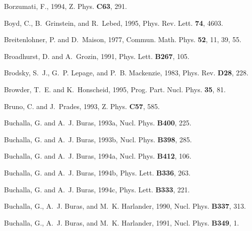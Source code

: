 \begin{thebibliography}{\protect{}1991}
Borzumati, F., 1994,
\newblock Z. Phys. {\bf C63}, 291.

Boyd, C., B.~Grinstein, and R.~Lebed, 1995,
\newblock Phys. Rev. Lett. {\bf 74}, 4603.

Breitenlohner, P. and D.~Maison, 1977,
\newblock Commun. Math. Phys. {\bf 52}, 11, 39, 55.

Broadhurst, D. and A.~Grozin, 1991,
\newblock Phys. Lett. {\bf B267}, 105.

Brodsky, S.~J., G.~P. Lepage, and P.~B. Mackenzie, 1983,
\newblock Phys. Rev. {\bf D28}, 228.

Browder, T.~E. and K.~Honscheid, 1995,
\newblock Prog. Part. Nucl. Phys. {\bf 35}, 81.

Bruno, C. and J.~Prades, 1993,
\newblock Z. Phys. {\bf C57}, 585.

Buchalla, G. and A.~J. Buras, 1993a,
\newblock Nucl. Phys. {\bf B400}, 225.

Buchalla, G. and A.~J. Buras, 1993b,
\newblock Nucl. Phys. {\bf B398}, 285.

Buchalla, G. and A.~J. Buras, 1994a,
\newblock Nucl. Phys. {\bf B412}, 106.

Buchalla, G. and A.~J. Buras, 1994b,
\newblock Phys. Lett. {\bf B336}, 263.

Buchalla, G. and A.~J. Buras, 1994c,
\newblock Phys. Lett. {\bf B333}, 221.

Buchalla, G., A.~J. Buras, and M.~K. Harlander, 1990,
\newblock Nucl. Phys. {\bf B337}, 313.

Buchalla, G., A.~J. Buras, and M.~K. Harlander, 1991,
\newblock Nucl. Phys. {\bf B349}, 1.


\end{thebibliography}
